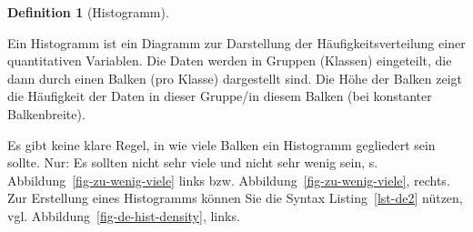 \documentclass[
  letterpaper,
  oneside,
  open=any]{scrbook}
\theoremstyle{definition}
\theoremstyle{definition}
\theoremstyle{definition}
\newtheorem{definition}{Definition}[chapter]
\theoremstyle{remark}
\begin{document}
\begin{definition}[Histogramm]\protect\hypertarget{def-histogramm}{}\label{def-histogramm}

Ein Histogramm ist ein Diagramm zur Darstellung der
Häufigkeitsverteilung einer quantitativen Variablen. Die Daten werden in
Gruppen (Klassen) eingeteilt, die dann durch einen Balken (pro Klasse)
dargestellt sind. Die Höhe der Balken zeigt die Häufigkeit der Daten in
dieser Gruppe/in diesem Balken (bei konstanter Balkenbreite).

\end{definition}

Es gibt keine klare Regel, in wie viele Balken ein Histogramm gegliedert
sein sollte. Nur: Es sollten nicht sehr viele und nicht sehr wenig sein,
s. Abbildung~\ref{fig-zu-wenig-viele} links bzw.
Abbildung~\ref{fig-zu-wenig-viele}, rechts. Zur Erstellung eines
Histogramms können Sie die Syntax Listing~\ref{lst-de2} nützen, vgl.
Abbildung~\ref{fig-de-hist-density}, links.
\end{document}
